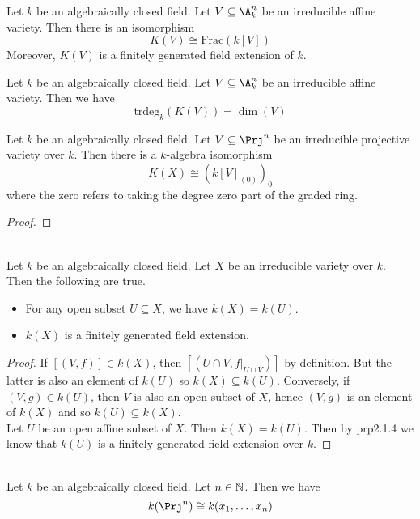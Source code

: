 \documentclass[a4paper]{article}
\begin{document}
\begin{prp}{}{} Let $k$ be an algebraically closed field. Let $V\subseteq\A_k^n$ be an irreducible affine variety. Then there is an isomorphism $$K(V)\cong\text{Frac}(k[V])$$ Moreover, $K(V)$ is a finitely generated field extension of $k$. 
\end{prp}

\begin{prp}{}{} Let $k$ be an algebraically closed field. Let $V\subseteq\A_k^n$ be an irreducible affine variety. Then we have $$\text{trdeg}_k(K(V))=\dim(V)$$
\end{prp}

\begin{prp}{}{} Let $k$ be an algebraically closed field. Let $V\subseteq\Prj^n$ be an irreducible projective variety over $k$. Then there is a $k$-algebra isomorphism $$K(X)\cong(k[V]_{(0)})_0$$ where the zero refers to taking the degree zero part of the graded ring. 
\begin{proof}
\end{proof}
\end{prp}

\begin{prp}{}{}\\
Let $k$ be an algebraically closed field. Let $X$ be an irreducible variety over $k$. Then the following are true. 
\begin{itemize}
\item For any open subset $U\subseteq X$, we have $k(X)=k(U)$. 
\item $k(X)$ is a finitely generated field extension. 
\end{itemize}
\begin{proof}
If $[(V,f)]\in k(X)$, then $[(U\cap V,f|_{U\cap V})]$ by definition. But the latter is also an element of $k(U)$ so $k(X)\subseteq k(U)$. Conversely, if $(V,g)\in k(U)$, then $V$ is also an open subset of $X$, hence $(V,g)$ is an element of $k(X)$ and so $k(U)\subseteq k(X)$. \\

Let $U$ be an open affine subset of $X$. Then $k(X)=k(U)$. Then by prp2.1.4 we know that $k(U)$ is a finitely generated field extension over $k$. 
\end{proof}
\end{prp}

\begin{eg}{}{}\\
Let $k$ be an algebraically closed field. Let $n\in\mathbb{N}$. Then we have $$k(\Prj^n)\cong k(x_1,\dots,x_n)$$
\end{eg}
\end{document}
